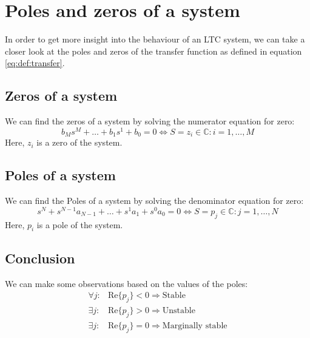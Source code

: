 \documentclass[]{subfiles}
\begin{document}
	\section{Poles and zeros of a system}
	In order to get more insight into the behaviour of an LTC system, we can take a closer look at the poles and zeros of the transfer function as defined in equation \ref{eq:def:transfer}. 
	\subsection{Zeros of a system}
	We can find the zeros of a system by solving the numerator equation for zero:
	\begin{equation}
		b_Ms^M+\ldots+b_1s^1+b_0=0 \Leftrightarrow S=z_i\in \mathbb{C}: i=1,\ldots,M
	\end{equation}
	Here, $z_i$ is a zero of the system.
		\subsection{Poles of a system}
	We can find the Poles of a system by solving the denominator equation for zero:
	\begin{equation}
		s^N+s^{N-1}a_{N-1}+\ldots+s^1a_1+s^0a_0=0 \Leftrightarrow S=p_j\in \mathbb{C}: j=1,\ldots,N
	\end{equation}
	Here, $p_i$ is a pole of the system.
	\subsection{Conclusion}
	We can make some observations based on the values of the poles:
	\begin{align}
		\forall j:& \text{Re}\{p_j\}<0 \Rightarrow \text{Stable}\\
		\exists j:& \text{Re}\{p_j\}>0 \Rightarrow \text{Unstable}\\
		\exists j:& \text{Re}\{p_j\}=0 \Rightarrow \text{Marginally stable}
	\end{align}
\end{document}
